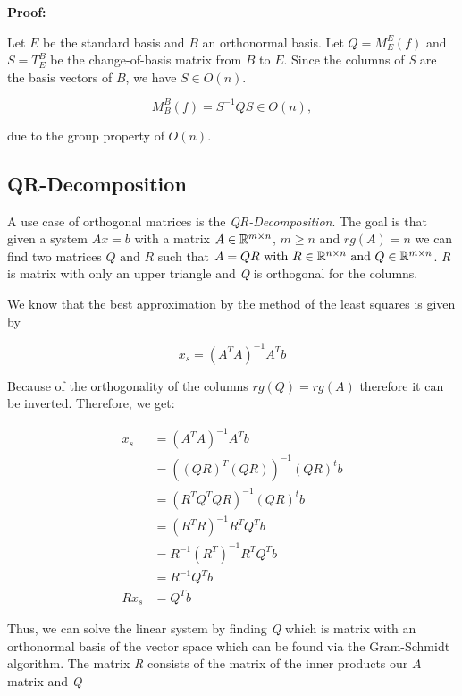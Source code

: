 \textbf{Proof:} 

Let \( E \) be the standard basis and \(B\) an orthonormal basis. Let  
\( Q = M_E^E(f) \) and \( S = T_E^B \) be the change-of-basis matrix from \(B\) to \( E \).  
Since the columns of \emph{S} are the basis vectors of \(B\), we have \( S \in O(n) \).  

\[
    M_B^B(f) = S^{-1} Q S \in O(n),
\]

due to the group property of \( O(n) \).

\QED

\subsection{QR-Decomposition}

A use case of orthogonal matrices is the \emph{QR-Decomposition}. The goal is that given a system 
\( Ax = b\) with a matrix \(A\in \mathbb{R}^{m \times n}\), \(m \ge n\) and \(rg(A) = n\) we can find 
two matrices \(Q \text{ and } R\) such that \(A = QR \text{ with } R\in \mathbb{R}^{n \times n} 
\text{ and } Q \in \mathbb{R}^{m \times n}\). \emph{R} is matrix with only an upper triangle and 
\emph{Q} is orthogonal for the columns.
\vspace{\baselineskip}

We know that the best approximation by the method of the least squares is given by

\[
    x_s = (A^T A)^{-1} A^T b
\]

Because of the orthogonality of the columns \(rg(Q) = rg(A)\) therefore it can be inverted. Therefore,
we get:

\begin{align*}
    x_s &= (A^T A)^{-1} A^T b \\
        &= ((QR)^T (QR))^{-1} (QR)^t b \\
        &= (R^T Q^T QR)^{-1} (QR)^t b \\
        &= (R^T R)^{-1} R^T Q^T b \\
        &=  R^{-1} (R^T)^{-1} R^T Q^T b \\
        &=  R^{-1} Q^T b \\
    Rx_s&= Q^T b
\end{align*}

Thus, we can solve the linear system by finding \emph{Q} which is matrix with an orthonormal basis of the 
vector space which can be found via the Gram-Schmidt algorithm. The matrix \emph{R} consists of the matrix of the 
inner products our \(A\) matrix and \emph{Q}

